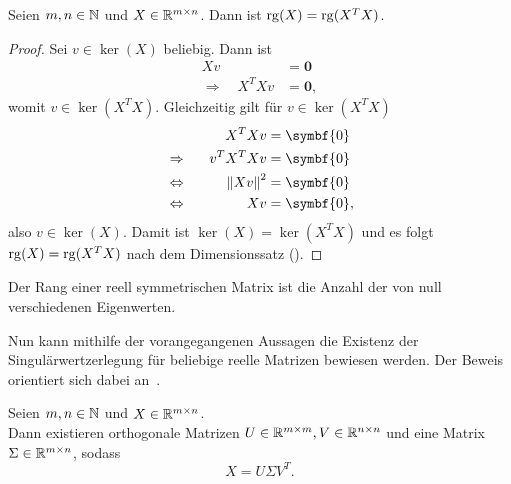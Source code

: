 \begin{lemma}\label{lem:rk}
    Seien \(m,n \in \mathbb{N}\) und \(X \in \mathbb{R}^{m \times n}\). 
    Dann ist \(\operatorname{rg}(X) = \operatorname{rg} (X^{T}X)\). 
\end{lemma}
\begin{proof}
    Sei \(v \in \ker(X)\) beliebig. 
    Dann ist 
    \begin{align*}
        Xv &= \symbf{0} \\
        \Rightarrow \quad X^{T}Xv &= \symbf{0},
    \end{align*}
    womit \(v \in \ker(X^{T}X)\).
    Gleichzeitig gilt für \(v \in \ker(X^{T}X)\) 
    \begin{alignat*}{2}
        && \qquad X^{T}Xv &= \symbf{0} \\
        &\Rightarrow& v^{T}X^{T}Xv &= \symbf{0} \\
        &\Lra& {\norm{Xv}}^{2} &= \symbf{0} \\
        &\Lra& Xv &= \symbf{0},
    \end{alignat*} 
    also \(v \in \ker(X)\).
    Damit ist \(\ker(X) = \ker(X^{T}X)\) und es folgt \(\operatorname{rg}(X) = \operatorname{rg}(X^{T}X)\) nach dem Dimensionssatz (). 
\end{proof}
\begin{repitition}\label{rep:eigrank}
    Der Rang einer reell symmetrischen Matrix ist die Anzahl der von null verschiedenen Eigenwerten.
\end{repitition}
Nun kann mithilfe der vorangegangenen Aussagen die Existenz der Singulärwertzerlegung für beliebige reelle Matrizen bewiesen werden.
Der Beweis orientiert sich dabei an~\cite{chenLecture5Singular2020}.
\begin{theorem}[Singulärwertzerlegung]\label{th:svd}
    Seien \(m,n\in\mathbb{N}\) und \(X \in \mathbb{R}^{m \times n}\). \\
    Dann existieren orthogonale Matrizen \(U \in \mathbb{R}^{m \times m}, V \in \mathbb{R}^{n \times n}\) und eine Matrix \(\Sigma \in \mathbb{R}^{m \times n}\), sodass
    \begin{equation*}
        X = U \Sigma V^{T}.
    \end{equation*}
\end{theorem}
